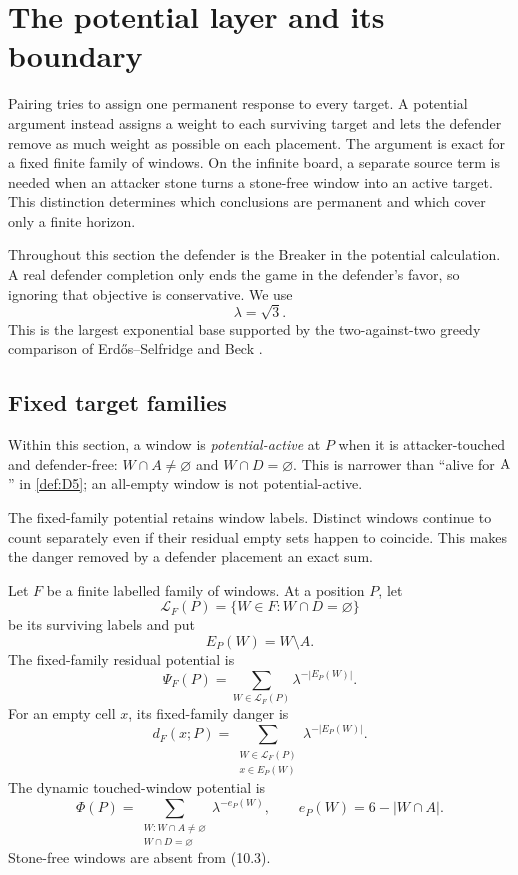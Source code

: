 \section{The potential layer and its boundary}
\label{sec:potential}

Pairing tries to assign one permanent response to every target.  A potential
argument instead assigns a weight to each surviving target and lets the
defender remove as much weight as possible on each placement.  The argument
is exact for a fixed finite family of windows.  On the infinite board, a
separate source term is needed when an attacker stone turns a stone-free
window into an active target.  This distinction determines which conclusions
are permanent and which cover only a finite horizon.

Throughout this section the defender is the Breaker in the potential
calculation.  A real defender completion only ends the game in the defender's
favor, so ignoring that objective is conservative.  We use
\[
 \lambda=\sqrt3.
\]
This is the largest exponential base supported by the two-against-two greedy
comparison of Erd\H{o}s--Selfridge and Beck
\cite{erdos-selfridge-1973,beck-2008}.

\subsection{Fixed target families}

Within this section, a window is \emph{potential-active} at $P$ when it is
attacker-touched and defender-free:
$W\cap A\ne\varnothing$ and $W\cap D=\varnothing$.  This is narrower than
``alive for $\mathrm{A}$'' in \cref{def:D5}; an all-empty window is not
potential-active.

The fixed-family potential retains window labels.  Distinct windows continue
to count separately even if their residual empty sets happen to coincide.
This makes the danger removed by a defender placement an exact sum.

\begin{definition}
\label{def:ES-potential}
Let $F$ be a finite labelled family of windows.  At a position $P$, let
\[
 \mathcal L_F(P)=\{W\in F:W\cap D=\varnothing\}
\]
be its surviving labels and put
\[
 E_P(W)=W\setminus A.
\]
The fixed-family residual potential is
\[
 \Psi_F(P)=\sum_{W\in\mathcal L_F(P)}
                   \lambda^{-|E_P(W)|}.
\tag{10.1}
\]
For an empty cell $x$, its fixed-family danger is
\[
 d_F(x;P)=
 \sum_{\substack{W\in\mathcal L_F(P)\\x\in E_P(W)}}
       \lambda^{-|E_P(W)|}.
\tag{10.2}
\]
The dynamic touched-window potential is
\[
 \Phi(P)=
 \sum_{\substack{W:W\cap A\ne\varnothing\\W\cap D=\varnothing}}
       \lambda^{-e_P(W)},
 \qquad e_P(W)=6-|W\cap A|.
\tag{10.3}
\]
Stone-free windows are absent from \textup{(10.3)}.
\end{definition}

